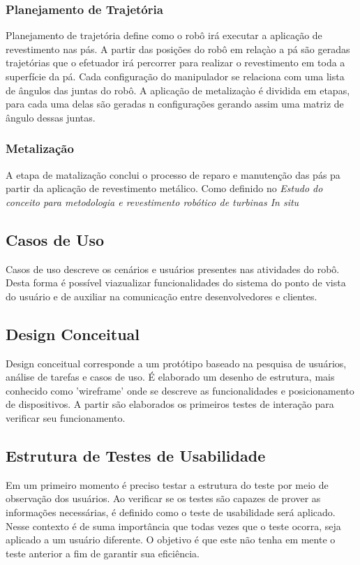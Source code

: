 \subsubsection{Planejamento de Trajetória}
Planejamento de trajetória define como o robô irá executar a aplicação de
revestimento nas pás. A partir das posições do robô em relaçào a pá são geradas
trajetórias que o efetuador irá percorrer para realizar o revestimento em toda a
superfície da pá. Cada configuração do manipulador se relaciona com uma lista de
ângulos das juntas do robô. A aplicação de metalizaçào é dividida em
etapas, para cada uma delas são geradas n configurações gerando assim uma matriz de
ângulo dessas juntas.


\subsubsection{Metalização}
A etapa de matalização conclui o processo de reparo e manutenção das pás pa
partir da aplicação de revestimento metálico. Como definido no \textit{Estudo do
conceito para metodologia e revestimento robótico de turbinas In situ}


\subsection{Casos de Uso}
Casos de uso descreve os cenários e usuários presentes nas atividades do robô.
Desta forma é possível viazualizar funcionalidades do sistema do ponto de vista
do usuário e de auxiliar na comunicação entre desenvolvedores e
clientes.

\subsection{Design Conceitual}
Design conceitual corresponde a um protótipo baseado na pesquisa de usuários,
análise de tarefas e casos de uso. É elaborado um desenho de estrutura, mais
conhecido como 'wireframe' onde se descreve as funcionalidades e posicionamento
de dispositivos. A partir são elaborados os primeiros testes de interação para
verificar seu funcionamento.

\subsection{Estrutura de Testes de Usabilidade}
Em um primeiro momento é preciso testar a estrutura do teste por meio de
observação dos usuários. Ao verificar se os testes são capazes de prover as
informações necessárias, é definido como o teste de usabilidade será aplicado.
Nesse contexto é de suma importância que todas vezes que o teste ocorra, seja
aplicado a um usuário diferente. O objetivo é que este não tenha em mente o
teste anterior a fim de garantir sua eficiência.







